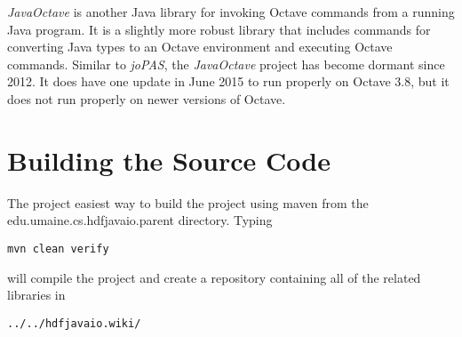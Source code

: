 \documentclass{memoir}
\begin{document}
\textit{JavaOctave} is another Java library for invoking Octave
commands from a running Java program.  It is a slightly more robust
library that includes commands for converting Java types to an Octave
environment and executing Octave commands.  Similar to \textit{joPAS},
the \textit{JavaOctave} project has become dormant since 2012.  It
does have one update in June 2015 to run properly on Octave 3.8, but
it does not run properly on newer versions of Octave.

\chapter{Building the Source Code}
\label{chap:source}

The project easiest way to build the project using maven from the
edu.umaine.cs.hdfjavaio.parent directory. Typing

\begin{verbatim}
mvn clean verify
\end{verbatim}

will compile the project and create a repository containing all of the
related libraries in

\begin{verbatim}
../../hdfjavaio.wiki/
\end{verbatim}




\end{document}
